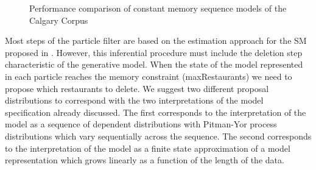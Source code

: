 


\begin{figure}[t] 
	\begin{center}
		\caption{Performance comparison of constant memory sequence models of the Calgary Corpus}
		\label{figResultsCC}
	\end{center} 
\end{figure} 

Most steps of the particle filter are based on the estimation approach for the SM proposed in \cite{Gasthaus2010}.  However, this inferential procedure must include the deletion step characteristic of the generative model.  When the state of the model represented in each particle reaches the memory constraint (maxRestaurants) we need to propose which restaurants to delete. We suggest two different proposal distributions to correspond with the two interpretations of the model specification already discussed.  The first corresponds to the interpretation of the model as a sequence of dependent distributions with Pitman-Yor process distributions which vary sequentially across the sequence.  The second corresponds to the interpretation of the model as a finite state approximation of a model representation which grows linearly as a function of the length of the data.

